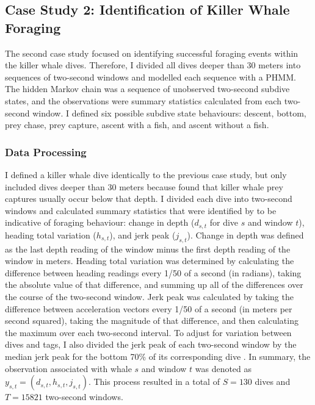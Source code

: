 \subsection{Case Study 2: Identification of Killer Whale Foraging}

The second case study focused on identifying successful foraging events within the killer whale dives. Therefore, I divided all dives deeper than 30 meters into sequences of two-second windows and modelled each sequence with a PHMM. %
The hidden Markov chain was a sequence of unobserved two-second subdive states, and the observations were summary statistics calculated from each two-second window. I defined six possible subdive state behaviours: descent, bottom, prey chase, prey capture, ascent with a fish, and ascent without a fish. %

\subsubsection{Data Processing}

I defined a killer whale dive identically to the previous case study, but only included dives deeper than 30 meters because \citet{Wright:2017} found that killer whale prey captures usually occur below that depth. I divided each dive into two-second windows and calculated summary statistics that were identified by \citet{Tennessen:2019a} to be indicative of foraging behaviour: change in depth ($d_{s,t}$ for dive $s$ and window $t$), heading total variation ($h_{s,t}$), and jerk peak ($j_{s,t}$).  Change in depth was defined as the last depth reading of the window minus the first depth reading of the window in meters. Heading total variation was determined by calculating the difference between heading readings every 1/50 of a second (in radians), taking the absolute value of that difference, and summing up all of the differences over the course of the two-second window. Jerk peak was calculated by taking the difference between acceleration vectors every 1/50 of a second (in meters per second squared), taking the magnitude of that difference, and then calculating the maximum over each two-second interval. To adjust for variation between dives and tags, I also divided the jerk peak of each two-second window by the median jerk peak for the bottom 70\% of its corresponding dive \citep{Tennessen:2019a}. In summary, the observation associated with whale $s$ and window $t$ was denoted as $y_{s,t} = (d_{s,t},h_{s,t},j_{s,t})$. This process resulted in a total of $S = 130$ dives and $T = 15821$ two-second windows.


